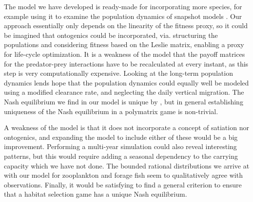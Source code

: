 





The model we have developed is ready-made for incorporating more species, for example using it to examine the population dynamics of snapshot models \citep{pinti2019trophic}. Our approach essentially only depends on the linearity of the fitness proxy, so it could be imagined that ontogenics could be incorporated, via. structuring the populations and considering fitness based on the Leslie matrix, enabling a proxy for life-cycle optimization. It is a weakness of the model that the payoff matrices for the predator-prey interactions have to be recalculated at every instant, as this step is very computationally expensive. Looking at the long-term population dynamics lends hope that the population dynamics could equally well be modeled using a modified clearance rate, and neglecting the daily vertical migration. The Nash equilibrium we find in our model is unique by \citep{verticalmigration}, but in general establishing uniqueness of the Nash equilibrium in a polymatrix game is non-trivial.

A weakness of the model is that it does not incorporate a concept of satiation nor ontogenics, and expanding the model to include either of these would be a big improvement. Performing a multi-year simulation could also reveal interesting patterns, but this would require adding a seasonal dependency to the carrying capacity which we have not done. The bounded rational distributions we arrive at with our model for zooplankton and forage fish seem to qualitatively agree with observations. Finally, it would be satisfying to find a general criterion to ensure that a habitat selection game has a unique Nash equilibrium.

